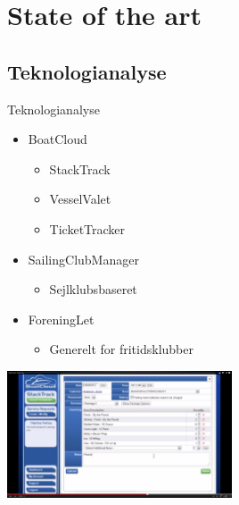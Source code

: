 \section{State of the art}
\subsection{Teknologianalyse}

\begin{frame}{Teknologianalyse}
  \begin{itemize}
    \item BoatCloud
    \begin{itemize}
      \item StackTrack
      \item VesselValet
      \item TicketTracker
    \end{itemize}
    \item SailingClubManager
    \begin{itemize}
      \item Sejlklubsbaseret
    \end{itemize}
    \item ForeningLet
    \begin{itemize}
      \item Generelt for fritidsklubber
    \end{itemize}
  \end{itemize}
  \begin{center}
        \includegraphics[width=0.5\textwidth]{images/StackTrack.jpg}

\end{center} 

\end{frame}

